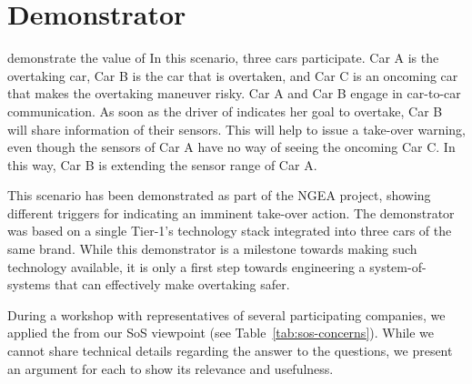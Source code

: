 \section{Demonstrator}





 demonstrate the value of  
In this scenario, three cars participate. 
Car A is the overtaking car, Car B is the car that is overtaken, and Car C is an oncoming car that makes the overtaking maneuver risky.
Car A and Car B engage in car-to-car communication.
As soon as the driver of  indicates her goal to overtake, Car B will share information of their sensors.
This will help to issue a take-over warning, even though the sensors of Car A have no way of seeing the oncoming Car C.
In this way, Car B is extending the sensor range of Car A.

This scenario has been demonstrated as part of the NGEA project, showing different triggers for indicating an imminent take-over action.
The demonstrator was based on a single Tier-1's technology stack integrated into three cars of the same brand.
While this demonstrator is a milestone towards making such technology available, it is only a first step towards engineering a system-of-systems that can effectively make overtaking safer.

During a workshop with representatives of several participating companies, we applied the  from our SoS viewpoint (see Table~\ref{tab:sos-concerns}). 
While we cannot share technical details regarding the answer to the questions, we present an argument for each to show its relevance and usefulness.

